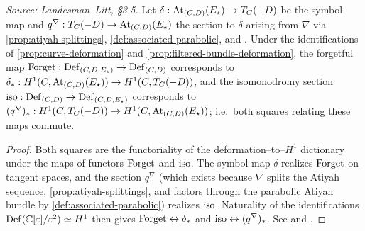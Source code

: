 \begin{proposition}
  \label{prop:connection-h1}
  \textit{Source: Landesman--Litt, \S3.5.}
  Let $\delta: \operatorname{At}_{(C,D)}(E_\star) \to T_C(-D)$ be the symbol map and
  $q^\nabla: T_C(-D) \to \operatorname{At}_{(C,D)}(E_\star)$ the section to $\delta$ arising
  from $\nabla$ via \cref{prop:atiyah-splittings},
  \cref{def:associated-parabolic}, and \cite[Lemma 4.1]{BHH:parabolic}. Under the
  identifications of \cref{prop:curve-deformation} and
  \cref{prop:filtered-bundle-deformation}, the forgetful map
  $\operatorname{Forget}: \operatorname{Def}_{(C,D,E_\star)} \to \operatorname{Def}_{(C,D)}$ corresponds to
  $\delta_*: H^1(C,\operatorname{At}_{(C,D)}(E_\star)) \to H^1(C,T_C(-D))$, and the
  isomonodromy section $\operatorname{iso}: \operatorname{Def}_{(C,D)} \to \operatorname{Def}_{(C,D,E_\star)}$
  corresponds to $(q^\nabla)_*: H^1(C,T_C(-D)) \to H^1(C,\operatorname{At}_{(C,D)}(E_\star))$;
  i.e.\ both squares relating these maps commute.
\end{proposition}
\begin{proof}
  Both squares are the functoriality of the deformation--to--$H^1$ dictionary
  under the maps of functors $\operatorname{Forget}$ and $\operatorname{iso}$. The symbol map
  $\delta$ realizes $\operatorname{Forget}$ on tangent spaces, and the section $q^\nabla$
  (which exists because $\nabla$ splits the Atiyah sequence,
  \cref{prop:atiyah-splittings}, and factors through the parabolic Atiyah bundle
  by \cref{def:associated-parabolic}) realizes $\operatorname{iso}$. Naturality of the
  identifications $\operatorname{Def}(\mathbb{C}[\varepsilon]/\varepsilon^2) \simeq H^1$ then gives
  $\operatorname{Forget} \leftrightarrow \delta_*$ and $\operatorname{iso} \leftrightarrow
  (q^\nabla)_*$. See \cite[Lemmas 3.1, 4.3]{BHH:parabolic} and
  \cite[\S2.2, \S4.1]{BHH:logarithmic}.
\end{proof}

